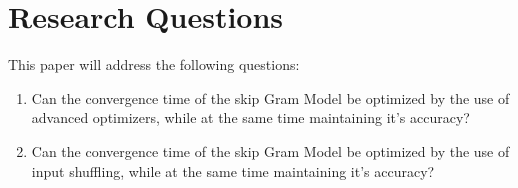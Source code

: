 \chapter{Research Questions}\label{chap:questions}

This paper will address the following questions: 
\begin{enumerate}
\item Can the convergence time of the skip Gram Model be optimized by the use of advanced optimizers, while at the same time maintaining it's accuracy? 
\item Can the convergence time of the skip Gram Model be optimized by the use of input shuffling, while at the same time maintaining it's accuracy? 
\end{enumerate}

